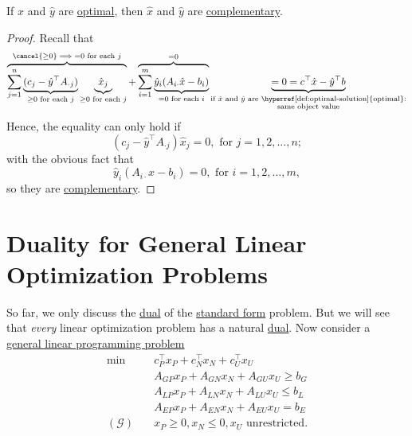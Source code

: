 \begin{theorem}\label{thm:strong-complementary-slackness-theorem}
	If \(\hat{x}\) and \(\hat{y}\) are \hyperref[def:optimal-solution]{optimal}, then \(\hat{x}\) and \(\hat{y}\) are \hyperref[def:complementary]{complementary}.
\end{theorem}
\begin{proof}
	Recall that
	\[
		\overbrace{\sum\limits_{j=1}^{n} \underbrace{(c_{j}-\hat{y}^{\top}A_{\cdot j})}_{ \geq 0\text{ for each }j}\underbrace{\hat{x}_{j}}_{\geq 0 \text{ for each }j}}^{\cancel{\geq 0}\implies = 0\text{ for each }j}
		+ \overbrace{\sum\limits_{i=1}^{m} \underbrace{\hat{y}_i(A_{i\cdot}\hat{x} - b_{i})}_{ = 0\text{ for each }i}}^{=0}
		\underbrace{= 0 = c^{\top}\hat{x} - \hat{y}^{\top}b}_{\substack{\text{if }\hat{x}\text{ and }\hat{y}\text{ are \hyperref[def:optimal-solution]{optimal}:}\\ \text{same object value}}}
	\]
	Hence, the equality can only hold if
	\[
		(c_{j} - \hat{y}^{\top}A_{\cdot j})\hat{x}_j = 0, \text{ for }j = 1, 2, \ldots , n;
	\]
	with the obvious fact that
	\[
		\hat{y}_i(A_{i\cdot}\hat{x} - b_{i}) = 0, \text{ for }i = 1, 2, \ldots , m,
	\]
	so they are \hyperref[def:complementary]{complementary}.
\end{proof}

\section{Duality for General Linear Optimization Problems}
So far, we only discuss the \hyperref[def:dual]{dual} of the \hyperref[def:standard-form]{standard form} problem. But we will see that \emph{every} linear optimization problem has a natural \hyperref[def:dual]{dual}. Now consider a \hyperref[def:general-linear-programming-problem]{general linear programming problem}
\[
	\begin{aligned}
		\min~              & c^{\top}_P x_P + c^{\top}_N x_N + c^{\top}_U x_U \\
		                   & A_{GP}x_P +A_{GN}x_N + A_{GU}x_U\geq b_G         \\
		                   & A_{LP}x_P +A_{LN}x_N + A_{LU}x_U \leq b_L        \\
		                   & A_{EP}x_P +A_{EN}x_N + A_{EU}x_U = b_E           \\
		(\mathcal{G})\quad & x_P\geq 0, x_N \leq 0, x_U \text{ unrestricted}.
	\end{aligned}
\]

